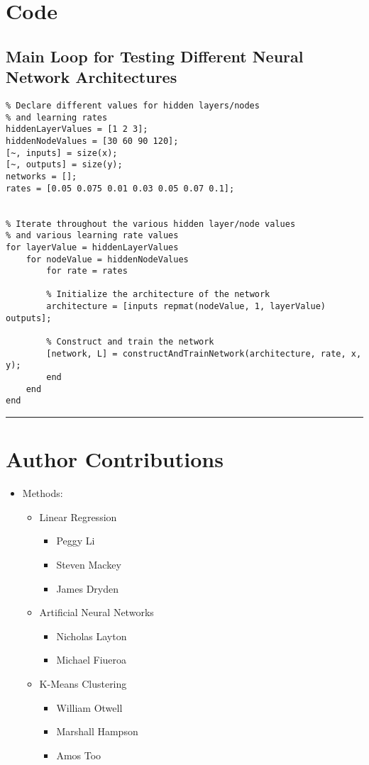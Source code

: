 \documentclass[12pt]{article}
\newcommand{\horizontalLine}{
	\begin{center}
		\hrule width 1.0\textwidth
	\end{center}
}
\begin{document}
\section{Code}
\label{sec:code}

\subsection{Main Loop for Testing Different Neural Network Architectures}
\label{subsec:annLoop}
\begin{lstlisting}
% Declare different values for hidden layers/nodes
% and learning rates
hiddenLayerValues = [1 2 3];
hiddenNodeValues = [30 60 90 120];
[~, inputs] = size(x);
[~, outputs] = size(y);
networks = [];
rates = [0.05 0.075 0.01 0.03 0.05 0.07 0.1];


% Iterate throughout the various hidden layer/node values
% and various learning rate values
for layerValue = hiddenLayerValues
    for nodeValue = hiddenNodeValues
        for rate = rates
        
        % Initialize the architecture of the network
        architecture = [inputs repmat(nodeValue, 1, layerValue) outputs];
        
        % Construct and train the network
        [network, L] = constructAndTrainNetwork(architecture, rate, x, y);
        end
    end
end
\end{lstlisting}

\horizontalLine
\section{Author Contributions}
\label{sec:authorContributions}

\begin{itemize}
    \item Methods:
    \begin{itemize}
        \item Linear Regression
        \begin{itemize}
            \item Peggy Li
            \item Steven Mackey
            \item James Dryden
        \end{itemize}
        \item Artificial Neural Networks
        \begin{itemize}
            \item Nicholas Layton
            \item Michael Fiueroa
        \end{itemize}
        \item K-Means Clustering
        \begin{itemize}
            \item William Otwell
            \item Marshall Hampson
            \item Amos Too
        \end{itemize}
    \end{itemize}
\end{itemize}
\end{document}
